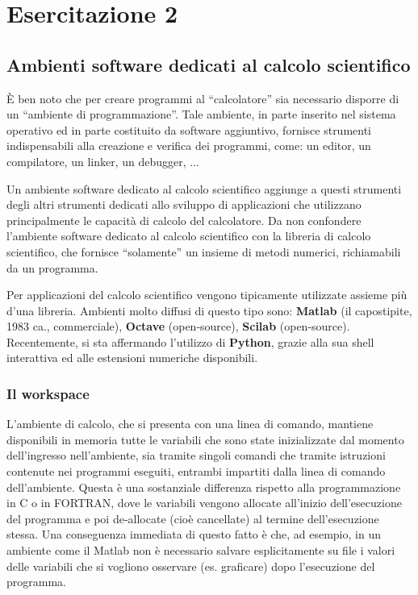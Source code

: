 \section{Esercitazione 2}

\subsection{Ambienti software dedicati al calcolo scientifico}

È ben noto che per creare programmi al ``calcolatore'' sia necessario disporre di un ``ambiente di programmazione''. Tale ambiente, in parte inserito nel sistema operativo ed in parte costituito da software aggiuntivo, fornisce strumenti indispensabili alla creazione e verifica dei programmi, come: un editor, un compilatore, un linker, un debugger, ...     

Un ambiente software dedicato al calcolo scientifico aggiunge a questi strumenti degli altri strumenti dedicati allo sviluppo di applicazioni che utilizzano principalmente le capacità di calcolo del calcolatore.
Da non confondere l'ambiente software dedicato al calcolo scientifico con la libreria di calcolo scientifico, che fornisce ``solamente'' un insieme di metodi numerici, richiamabili da un programma. 

Per applicazioni del calcolo scientifico vengono tipicamente utilizzate assieme più d'una libreria. Ambienti molto diffusi di questo tipo sono: \textbf{Matlab} (il capostipite, 1983 ca., commerciale), \textbf{Octave} (open-source), \textbf{Scilab} (open-source). Recentemente, si sta affermando l'utilizzo di \textbf{Python}, grazie alla sua shell interattiva ed alle estensioni numeriche disponibili.

\subsubsection{Il workspace}

L’ambiente di calcolo, che si presenta con una linea di comando, mantiene disponibili in memoria tutte le variabili che sono state inizializzate dal momento dell'ingresso nell’ambiente, sia tramite singoli comandi che tramite istruzioni contenute nei programmi eseguiti, entrambi impartiti dalla linea di comando dell'ambiente. Questa è una sostanziale differenza rispetto alla programmazione in C o in FORTRAN, dove le variabili vengono allocate all’inizio dell’esecuzione del programma e poi de-allocate (cioè cancellate) al termine dell’esecuzione stessa. Una conseguenza immediata di questo fatto è che, ad esempio, in un ambiente come il Matlab non è necessario salvare esplicitamente su file i valori delle variabili che si vogliono osservare (es. graficare) dopo l’esecuzione del programma.

